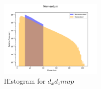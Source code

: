 \documentclass[EPJ,twocolumn]{webofc}
\begin{document}





\begin{figure}[H]
    \centering
    \includegraphics[width=0.45\textwidth]{graphs/hadr_Momentum.png}
    \caption{Histogram for $d_xd_zmup$}
    \label{fig:had_Angle_mu_2}
\end{figure}
\end{document}
